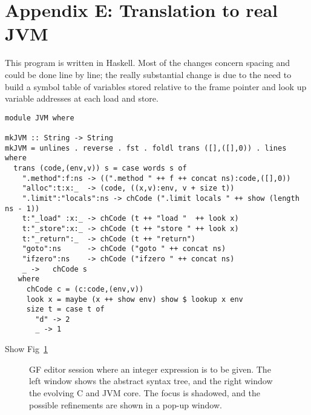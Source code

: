 \documentclass[12pt]{article}
\begin{document}
\section*{Appendix E: Translation to real JVM}

This program is written in Haskell. Most of the changes concern
spacing and could be done line by line; the really substantial
change is due to the need to build a symbol table of variables
stored relative to the frame pointer and look up variable
addresses at each load and store.
\small
\begin{verbatim}
module JVM where

mkJVM :: String -> String
mkJVM = unlines . reverse . fst . foldl trans ([],([],0)) . lines where
  trans (code,(env,v)) s = case words s of
    ".method":f:ns -> ((".method " ++ f ++ concat ns):code,([],0))
    "alloc":t:x:_  -> (code, ((x,v):env, v + size t))
    ".limit":"locals":ns -> chCode (".limit locals " ++ show (length ns - 1))
    t:"_load" :x:_ -> chCode (t ++ "load "  ++ look x) 
    t:"_store":x:_ -> chCode (t ++ "store " ++ look x)
    t:"_return":_  -> chCode (t ++ "return")
    "goto":ns      -> chCode ("goto " ++ concat ns)
    "ifzero":ns    -> chCode ("ifzero " ++ concat ns) 
    _ ->   chCode s
   where
     chCode c = (c:code,(env,v))
     look x = maybe (x ++ show env) show $ lookup x env
     size t = case t of
       "d" -> 2
       _ -> 1
\end{verbatim}
\normalsize
\newpage

Show Fig~\ref{demo}

\begin{figure}
\centerline{} \caption{
GF editor session where an integer
expression is to be given. The left window shows the
abstract syntax tree, and the right window the evolving C and
JVM core. The focus is shadowed, and the possible refinements
are shown in a pop-up window.
}
\label{demo}
\end{figure}
\end{document}
